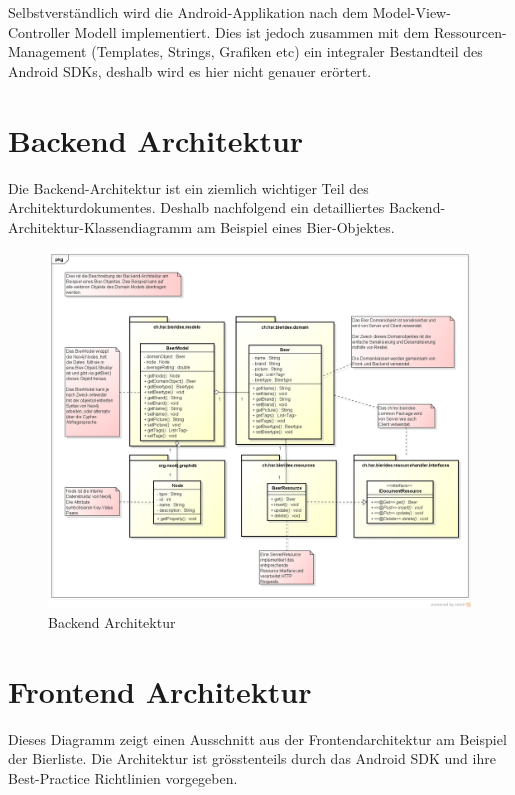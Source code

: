 \documentclass[10pt,a4paper]{scrartcl}
\begin{document}
Selbstverständlich wird die Android-Applikation nach dem Model-View-Controller Modell implementiert.
Dies ist jedoch zusammen mit dem Ressourcen-Management (Templates, Strings, Grafiken etc) ein integraler Bestandteil des Android SDKs, deshalb wird es hier nicht genauer erörtert.


\newpage
\section{Backend Architektur}

Die Backend-Architektur ist ein ziemlich wichtiger Teil des Architekturdokumentes. Deshalb
nachfolgend ein detailliertes Backend-Architektur-Klassendiagramm am Beispiel eines Bier-Objektes.

\begin{figure}[H]
	\includegraphics[height=\textwidth,angle=90]{BackendArchitektur.png}
	\caption{Backend Architektur}
	\label{fig:backend_architecture}
\end{figure}

\newpage
\section{Frontend Architektur}

Dieses Diagramm zeigt einen Ausschnitt aus der Frontendarchitektur am Beispiel der Bierliste. Die
Architektur ist grösstenteils durch das Android SDK und ihre Best-Practice Richtlinien vorgegeben.
\end{document}
